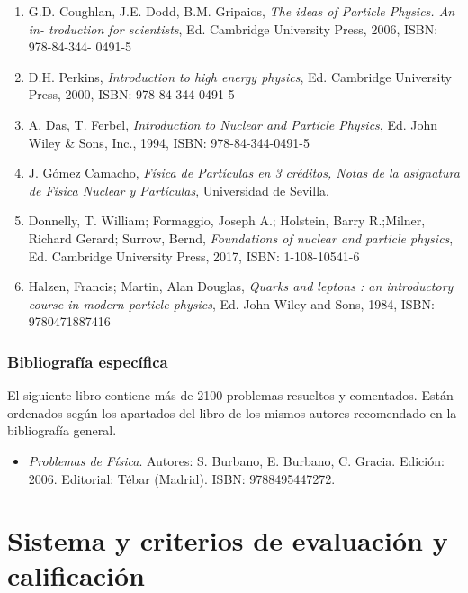 \documentclass[a4paper,12pt,twoside]{article}
\begin{document}
\begin{enumerate}
\item G.D. Coughlan, J.E. Dodd, B.M. Gripaios, \textit{The ideas of Particle Physics. An in-
troduction for scientists}, Ed. Cambridge University Press, 2006, ISBN: 978-84-344-
0491-5

\item D.H. Perkins, \textit{Introduction to high energy physics}, Ed. Cambridge University Press,
2000, ISBN: 978-84-344-0491-5

\item A. Das, T. Ferbel, \textit{Introduction to Nuclear and Particle Physics}, Ed. John Wiley \&
Sons, Inc., 1994, ISBN: 978-84-344-0491-5

\item J. Gómez Camacho, \textit{Física de Partículas en 3 créditos, Notas de la asignatura de
Física Nuclear y Partículas}, Universidad de Sevilla.

\item Donnelly, T. William; Formaggio, Joseph A.; Holstein, Barry R.;Milner, Richard
Gerard; Surrow, Bernd, \textit{Foundations of nuclear and particle physics}, Ed. Cambridge
University Press, 2017, ISBN: 1-108-10541-6

\item Halzen, Francis; Martin, Alan Douglas, \textit{Quarks and leptons : an introductory course
in modern particle physics}, Ed. John Wiley and Sons, 1984, ISBN: 9780471887416

\end{enumerate}




\subsubsection*{Bibliografía específica}

El siguiente libro contiene más de 2100 problemas  resueltos y comentados. Están ordenados según los apartados del libro de los mismos autores recomendado en la bibliografía general. 
\begin{itemize}
\item \textit{Problemas de Física}. Autores: S. Burbano, E. Burbano, C. Gracia. Edición: 2006. Editorial: Tébar (Madrid). ISBN: 9788495447272.
\end{itemize}

\section{Sistema y criterios de evaluación y calificación}
\end{document}
